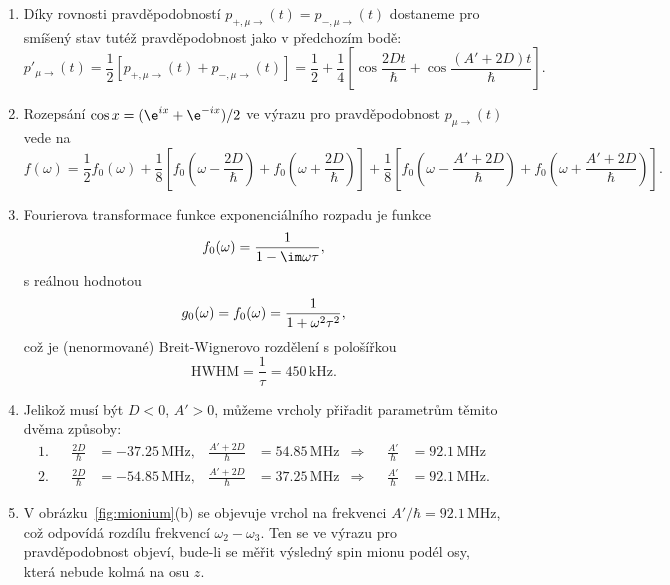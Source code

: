 \begin{solution}
\begin{enumerate}
	\item
		Díky rovnosti pravděpodobností $p_{+,\mu\rightarrow}(t)=p_{-,\mu\rightarrow}(t)$ dostaneme pro smíšený stav tutéž pravděpodobnost jako v předchozím bodě:
		\begin{equation}
			p'_{\mu\rightarrow}(t)
				=\frac{1}{2}\left[p_{+,\mu\rightarrow}(t)+p_{-,\mu\rightarrow}(t)\right]
				=\frac{1}{2}+\frac{1}{4}\left[\cos{\frac{2Dt}{\hbar}}+\cos\frac{\left(A'+2D\right)t}{\hbar}\right].
		\end{equation}
	
	\item
		Rozepsání $\cos{x}=(\e^{ix}+\e^{-ix})/2$ ve výrazu pro pravděpodobnost $p_{\mu\rightarrow}(t)$ vede na
		\begin{equation}
			f(\omega)=\frac{1}{2}f_{0}(\omega)
				+\frac{1}{8}\left[f_{0}\left(\omega-\frac{2D}{\hbar}\right)+f_{0}\left(\omega+\frac{2D}{\hbar}\right)\right]
				+\frac{1}{8}\left[f_{0}\left(\omega-\frac{A'+2D}{\hbar}\right)+f_{0}\left(\omega+\frac{A'+2D}{\hbar}\right)\right].
		\end{equation}
	
	\item 
		Fourierova transformace funkce exponenciálního rozpadu je funkce
		\begin{equation}
			f_{0}(\omega)=\frac{1}{1-\im\omega\tau},
		\end{equation}
		s reálnou hodnotou
		\begin{equation}
			g_{0}(\omega)=\real f_{0}(\omega)=\frac{1}{1+\omega^{2}\tau^{2}},
		\end{equation}
		což je (nenormované) Breit-Wignerovo rozdělení s pološířkou 
		\begin{equation}
			\mathrm{HWHM}=\frac{1}{\tau}=450\,\mathrm{kHz}.
		\end{equation}
		
	\item 
		Jelikož musí být $D<0$, $A'>0$, můžeme vrcholy přiřadit parametrům těmito dvěma způsoby:
		\begin{subequations}
			\begin{align}
				1. && 
					\frac{2D}{\hbar} &=-37.25\,\mathrm{MHz}, &
					\frac{A'+2D}{\hbar}&=54.85\,\mathrm{MHz} & \Longrightarrow && \frac{A'}{\hbar}&=92.1\,\mathrm{MHz}\\
				2. &&
					\frac{2D}{\hbar} &=-54.85\,\mathrm{MHz}, &
						\frac{A'+2D}{\hbar}&=37.25\,\mathrm{MHz} & \Longrightarrow && \frac{A'}{\hbar}&=92.1\,\mathrm{MHz}.
			\end{align}						
		\end{subequations}
	\item
		V obrázku~\ref{fig:mionium}(b) se objevuje vrchol na frekvenci $A'/\hbar=92.1\,\mathrm{MHz}$, což odpovídá
		rozdílu frekvencí $\omega_{2}-\omega_{3}$.
		Ten se ve výrazu pro pravděpodobnost objeví, bude-li se měřit výsledný spin mionu podél osy, která nebude kolmá na osu $z$.
	\end{enumerate}
\end{solution}

